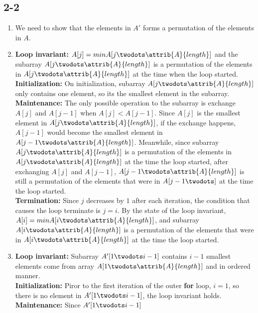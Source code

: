 \subsection{2-2}
\begin{enumerate}[leftmargin=*]
	\item We need to show that the elements in $A'$ forms a permutation 
		of the elements in $A$.
	\item \textbf{Loop invariant:} $A[j]=min{A[j\twodots \attrib{A}{length}]}$
		and the subarray $A[j\twodots \attrib{A}{length}]$ is 
		a permutation of the elements in $A[j\twodots \attrib
		{A}{length}]$ at the time when the loop started.\\
		\textbf{Initialization:} On initialization, subarray
		$A[j\twodots \attrib{A}{length}]$ only contains one
		element, so its the smallest element in the subarray.\\
		\textbf{Maintenance:} The only possible operation to
		the subarray is exchange $A[j]$ and $A[j-1]$ when
		$A[j]<A[j-1]$. Since $A[j]$ is the smallest element
		in $A[j\twodots \attrib{A}{length}]$, if the exchange
		happens, $A[j-1]$ would become the smallest element
		in $A[j-1\twodots \attrib{A}{length}]$. Meanwhile, 
		since subarray $A[j\twodots \attrib{A}{length}]$
		is a permutation of the elements in 
		$A[j\twodots \attrib{A}{length}]$ at the time the
		loop started, after exchanging $A[j]$ and $A[j-1]$,
		$A[j-1\twodots \attrib{A}{length}]$ is still a 
		permutation of the elements that were in $A[j-1\twodots]$
		at the time the loop started.\\
		\textbf{Termination:} Since $j$ decreases by $1$ 
		after each iteration, the condition that causes 
		the loop terminate is $j=i$. By the state of the
		loop invariant, $A[i]=min{A[i\twodots \attrib
		{A}{length}]}$, and subarray
		$A[i\twodots \attrib{A}{length}]$ is a permutation
		of the elements that were in $A[i\twodots \attrib
		{A}{length}]$ at the time the loop started.
	\item \textbf{Loop invariant:} Subarray $A'[1\twodots i-1]$
		contains $i-1$ smallest elements come from
		array $A[1\twodots \attrib{A}{length}]$ and in
		ordered manner.\\
		\textbf{Initialization:} Piror to the first 
		iteration of the outer \textbf{for} loop, 
		$i=1$, so there is no element in $A'[1\twodots i-1]$,
		the loop invariant holds.\\
		\textbf{Maintenance:} Since $A'[1\twodots i-1]$

\end{enumerate}
